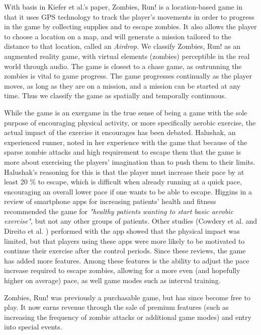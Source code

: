 With basis in Kiefer et al.'s \cite{kiefer2006systematically} paper, Zombies, Run! is a location-based game in that it uses GPS technology to track the player's movements in order to progress in the game by collecting supplies and to escape zombies. It also allows the player to choose a location on a map, and will generate a mission tailored to the distance to that location, called an \emph{Airdrop}. We classify Zombies, Run! as an augmented reality game, with virtual elements (zombies) perceptible in the real world through audio. The game is closest to a chase game, as outrunning the zombies is vital to game progress. The game progresses continually as the player moves, as long as they are on a mission, and a mission can be started at any time. Thus we classify the game as spatially and temporally continuous.

While the game is an exergame in the true sense of being a game with the sole purpose of encouraging physical activity, or more specifically aerobic exercise, the actual impact of the exercise it encourages has been debated. Halushak, an experienced runner, noted in her experience with the game that because of the sparse zombie attacks and high requirement to escape them that the game is more about exercising the players' imagination than to push them to their limits. Halushak's reasoning for this is that the player must increase their pace by at least 20 \% to escape, which is difficult when already running at a quick pace, encouraging an overall lower pace if one wants to be able to escape. Higgins \cite{higgins2016smartphone} in a review of smartphone apps for increasing patients' health and fitness recommended the game for \emph{"healthy patients wanting to start basic aerobic exercise"}, but not any other groups of patients. Other studies (Cowdery et al. \cite{cowdery2015exergame} and Direito et al. \cite{direito2015apps}) performed with the app showed that the physical impact was limited, but that players using these apps were more likely to be motivated to continue their exercise after the control periods. Since these reviews, the game has added more features. Among these features is the ability to adjust the pace increase required to escape zombies, allowing for a more even (and hopefully higher on average) pace, as well game modes such as interval training.

Zombies, Run! was previously a purchasable game, but has since become free to play. It now earns revenue through the sale of premium features (such as increasing the frequency of zombie attacks or additional game modes) and entry into special events.

